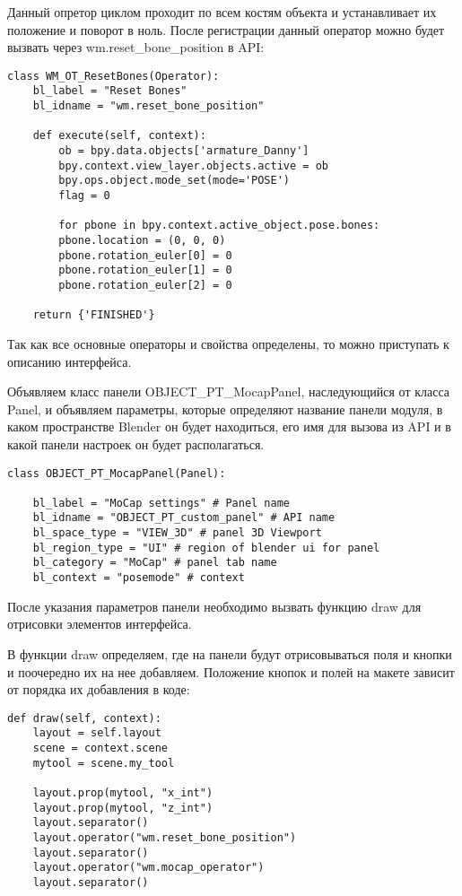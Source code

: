 Данный опретор циклом проходит по всем костям объекта и устанавливает их положение и поворот в ноль. После регистрации данный оператор можно будет вызвать через wm.reset\_bone\_position в API:
\begin{lstlisting}
class WM_OT_ResetBones(Operator):
	bl_label = "Reset Bones"
	bl_idname = "wm.reset_bone_position"
	
	def execute(self, context):
		ob = bpy.data.objects['armature_Danny']
		bpy.context.view_layer.objects.active = ob
		bpy.ops.object.mode_set(mode='POSE')
		flag = 0
		
		for pbone in bpy.context.active_object.pose.bones:
		pbone.location = (0, 0, 0)
		pbone.rotation_euler[0] = 0
		pbone.rotation_euler[1] = 0
		pbone.rotation_euler[2] = 0
	
	return {'FINISHED'}
\end{lstlisting}

Так как все основные операторы и свойства определены, то можно приступать к описанию интерфейса.

Объявляем класс панели OBJECT\_PT\_MocapPanel, наследующийся от класса Panel, и объявляем параметры, которые определяют название панели модуля, в каком пространстве Blender он будет находиться, его имя для вызова из API и в какой панели настроек он будет располагаться.

\begin{lstlisting}
class OBJECT_PT_MocapPanel(Panel):

	bl_label = "MoCap settings" # Panel name
	bl_idname = "OBJECT_PT_custom_panel" # API name
	bl_space_type = "VIEW_3D" # panel 3D Viewport
	bl_region_type = "UI" # region of blender ui for panel
	bl_category = "MoCap" # panel tab name
	bl_context = "posemode" # context
\end{lstlisting}

После указания параметров панели необходимо вызвать функцию draw для отрисовки элементов интерфейса.

В функции draw определяем, где на панели будут отрисовываться поля и кнопки и поочередно их на нее добавляем. Положение кнопок и полей на макете зависит от порядка их добавления в коде:
\begin{lstlisting}
def draw(self, context):
	layout = self.layout
	scene = context.scene
	mytool = scene.my_tool
	
	layout.prop(mytool, "x_int")
	layout.prop(mytool, "z_int")
	layout.separator()
	layout.operator("wm.reset_bone_position")
	layout.separator()
	layout.operator("wm.mocap_operator")
	layout.separator()
\end{lstlisting}

